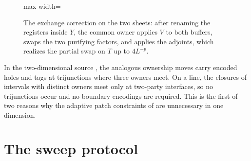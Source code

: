 \begin{figure}[t]
\centering
\begin{adjustbox}{max width=\linewidth}

\end{adjustbox}
\caption{The exchange correction on the two sheets: after renaming the registers inside $Y$, the common owner applies $V$ to both buffers, swaps the two purifying factors, and applies the adjoints, which realizes the partial swap on $T$ up to $4L^{-p}$.}\label{fig:qc-exchange}
\end{figure}

\begin{remark}
In the two-dimensional source \cite{PP}, the analogous ownership moves carry
encoded holes and tags at trijunctions where three owners meet. On a line, the
closures of intervals with distinct owners meet only at two-party interfaces, so
no trijunctions occur and no boundary encodings are required. This is the first of
two reasons why the adaptive patch constraints of \cite[Section~4]{PP} are
unnecessary in one dimension.
\end{remark}

\section{The sweep protocol}\label{sec:sweep}

